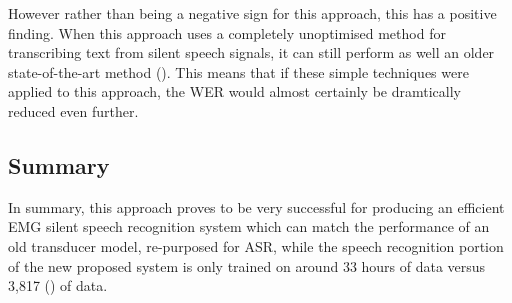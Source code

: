 However rather than being a negative sign for this approach, this has a positive
finding. When this approach uses a completely unoptimised method for transcribing
text from silent speech signals, it can still perform as well an older
state-of-the-art method (\cite{gaddy2020digital}). This means that if these
simple techniques were applied to this approach, the WER would almost
certainly be dramtically reduced even further.

\subsection{Summary}

In summary, this approach proves to be very successful for producing
an efficient EMG silent speech recognition system which can match the
performance of an old transducer model, re-purposed for ASR, while
the speech recognition portion of the new proposed system is only trained
on around 33 hours of data versus 3,817 (\cite{deepspeech0.7.0-training-ref}) of data.